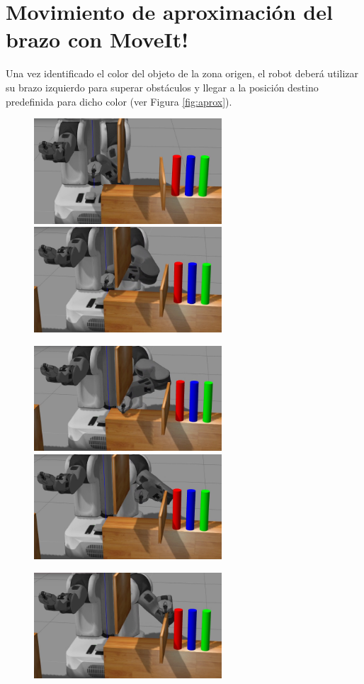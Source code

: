\documentclass[12pt,spanish,chapterprefix, numbers=noenddot]{book}
\numberwithin{equation}{section}
\numberwithin{figure}{section}
\begin{document}
\section{Movimiento de aproximación del brazo con MoveIt!}
Una vez identificado el color del objeto de la zona origen, el robot deberá utilizar su brazo izquierdo para superar obstáculos y llegar a la posición destino predefinida para dicho color (ver Figura \ref{fig:aprox}). 

\begin{figure}[hbt!]
\centering
\includegraphics[width=7cm]{Figs/fase3_1.png}
\includegraphics[width=7cm]{Figs/fase3_2.png}
\par
\centering
\includegraphics[width=7cm]{Figs/fase3_3.png}
\includegraphics[width=7cm]{Figs/fase3_4.png}
\par
\centering
\includegraphics[width=7cm]{Figs/fase3_5.png}

\end{figure}
\end{document}
